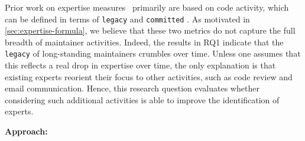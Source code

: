 Prior work on expertise measures~\cite{Anvik-2006, Bhattacharya, McDonald, Minto-2007, mockus02} primarily are based on code activity, which can be defined in terms of \texttt{legacy} and \texttt{committed}%
. As motivated in \autoref{sec:expertise-formula}, we believe that these two metrics do not capture the full breadth of maintainer activities. Indeed, the results in RQ1 indicate that the \texttt{legacy} of long-standing maintainers crumbles over time. Unless one assumes that this reflects a real drop in expertise over time, the only explanation is that existing experts reorient their focus to other activities, such as code review and email communication. Hence, this research question evaluates whether considering such additional activities is able to improve the identification of experts.%

{\bf Approach:}





